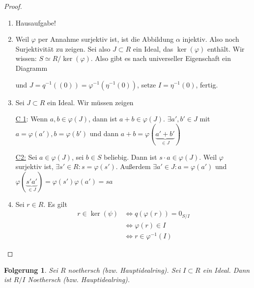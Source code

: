 \documentclass[a4paper,12pt,numbers=noenddot,parskip=full]{scrartcl}
\newcommand{\heading}{\underline}
\theoremstyle{dotless}
\newtheorem{corollary}[theorem]{Folgerung}
\theoremstyle{remark}
\begin{document}
	\begin{proof}
		\begin{enumerate}
			\item Hausaufgabe!
			\item Weil $\varphi$ per Annahme surjektiv ist, ist die Abbildung $\alpha$ injektiv. Also noch Surjektivität zu zeigen. Sei also $J \subset R$ ein Ideal, das $\ker(\varphi)$ enthält. Wir wissen: $S \simeq R/\ker(\varphi)$. Also gibt es nach universeller Eigenschaft ein Diagramm
			\begin{center}
			\end{center}
			und $J = q^{-1}((0)) = \varphi^{-1}(\eta^{-1}(0))$, setze $I = \eta^{-1}(0)$, fertig.
			\item Sei $J \subset R$ ein Ideal. Wir müssen zeigen
			
			\heading{C 1}: Wenn $a,b \in \varphi(J)$, dann ist $a + b \in \varphi(J)$. $\exists a', b' \in J$ mit $a =  \varphi(a'), b = \varphi(b')$ und dann $a + b = \varphi(\underbrace{a' + b'}_{\in J})$
			
			\heading{C2:} Sei $a \in \varphi(J)$, sei $b \in S$ beliebig. Dann ist $s \cdot a \in \varphi(J)$. Weil $\varphi$ surjektiv ist, $\exists s' \in R: s = \varphi(s')$. Außerdem $\exists a' \in J: a = \varphi(a')$ und $\varphi(\underbrace{s' a'}_{\in J}) = \varphi(s') \varphi(a') = sa$
			
			\item Sei $r \in R$. Es gilt
			\begin{align*}
				r \in \ker(\psi) &\Leftrightarrow q(\varphi(r)) = 0_{S/I} \\
				&\Leftrightarrow \varphi(r) \in I \\
				&\Leftrightarrow r \in \varphi^{-1}(I)
			\end{align*}
		\end{enumerate}
	\end{proof}

	\begin{corollary}
		Sei $R$ noethersch (bzw. Hauptidealring). Sei $I \subset R$ ein Ideal. Dann ist $R/I$ Noethersch (bzw. Hauptidealring).
	\end{corollary}
\end{document}
